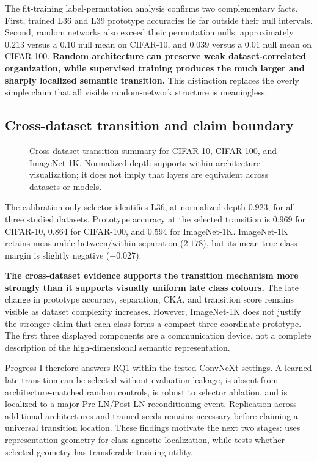 

The fit-training label-permutation analysis confirms two complementary facts.
First, trained L36 and L39 prototype accuracies lie far outside their null
intervals. Second, random networks also exceed their permutation nulls:
approximately $0.213$ versus a $0.10$ null mean on CIFAR-10, and $0.039$ versus
a $0.01$ null mean on CIFAR-100. \textbf{Random architecture can preserve weak
dataset-correlated organization, while supervised training produces the much
larger and sharply localized semantic transition.} This distinction replaces
the overly simple claim that all visible random-network structure is
meaningless.

\subsection{Cross-dataset transition and claim boundary}

\begin{figure}[!htbp]
    \centering
    \caption{Cross-dataset transition summary for CIFAR-10, CIFAR-100, and
    ImageNet-1K. Normalized depth supports within-architecture visualization;
    it does not imply that layers are equivalent across datasets or models.}
    \label{fig:pca-cross-dataset}
\end{figure}



The calibration-only selector identifies L36, at normalized depth $0.923$, for
all three studied datasets. Prototype accuracy at the selected transition is
$0.969$ for CIFAR-10, $0.864$ for CIFAR-100, and $0.594$ for ImageNet-1K.
ImageNet-1K retains measurable between/within separation ($2.178$), but its
mean true-class margin is slightly negative ($-0.027$).

\textbf{The cross-dataset evidence supports the transition mechanism more
strongly than it supports visually uniform late class colours.} The late
change in prototype accuracy, separation, CKA, and transition score remains
visible as dataset complexity increases. However, ImageNet-1K does not justify
the stronger claim that each class forms a compact three-coordinate prototype.
The first three displayed components are a communication device, not a complete
description of the high-dimensional semantic representation.

Progress I therefore answers RQ1 within the tested ConvNeXt settings. A learned
late transition can be selected without evaluation leakage, is absent from
architecture-matched random controls, is robust to selector ablation, and is
localized to a major Pre-LN/Post-LN reconditioning event. Replication across
additional architectures and trained seeds remains necessary before claiming a
universal transition location. These findings motivate the next two stages:
\methodname{} uses representation geometry for class-agnostic localization,
while \jmethod{} tests whether selected geometry has transferable training
utility.
